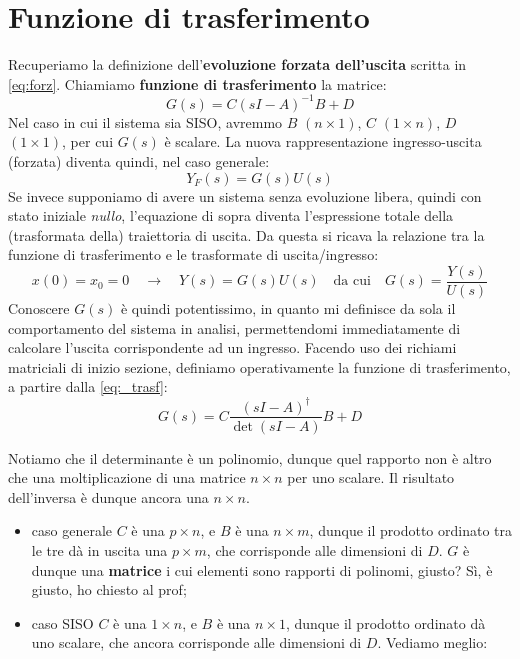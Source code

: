 \section{Funzione di trasferimento}
\begin{defin}{}{}
Recuperiamo la definizione dell'\textbf{evoluzione forzata dell'uscita} scritta in \eqref{eq:forz}. Chiamiamo  \textbf{funzione di trasferimento} la matrice:
\begin{equation}
\label{eq:_trasf}
G(s) = C(sI-A)^{-1}B + D
\end{equation}
Nel caso in cui il sistema sia SISO, avremmo $B$ $(n\times 1)$, $C$ $(1 \times n)$, $D$ $(1 \times 1)$, per cui $G(s)$ è scalare. La nuova rappresentazione ingresso-uscita (forzata) diventa quindi, nel caso generale:
\begin{equation}
\label{eq:gs_evoforz_y}
Y_F(s) = G(s)U(s)
\end{equation}
Se invece supponiamo di avere un sistema senza evoluzione libera, quindi con stato iniziale \textit{nullo}, l'equazione di sopra diventa l'espressione totale della (trasformata della) traiettoria di uscita. Da questa si ricava la relazione tra la funzione di trasferimento e le trasformate di uscita/ingresso:
\begin{equation}
	x(0) = x_0 = 0 \quad \rightarrow \quad Y(s) = G(s)U(s) \quad \textrm{da cui} \quad \boxed{G(s) = \frac{Y(s)}{U(s)}}
\end{equation}
Conoscere $G(s)$ è quindi potentissimo, in quanto mi definisce da sola il comportamento del sistema in analisi, permettendomi immediatamente di calcolare l'uscita corrispondente ad un ingresso.
\bb
Facendo uso dei richiami matriciali di inizio sezione, definiamo operativamente la funzione di trasferimento, a partire dalla \eqref{eq:_trasf}:
\begin{equation}
G(s) = C \frac{(sI-A)^\dag}{\det(sI-A)}B+D
\end{equation} 
\end{defin}
Notiamo che il determinante è un polinomio, dunque quel rapporto non è altro che una moltiplicazione di una matrice $n\times n$ per uno scalare. Il risultato dell'inversa è dunque ancora una $n\times n$.
\begin{itemize}
\item caso generale \rarr $C$ è una $p \times n$, e $B$ è una $n \times m$, dunque il prodotto ordinato tra le tre dà in uscita una $p \times m$, che corrisponde alle dimensioni di $D$. $G$ è dunque una \textbf{matrice} i cui elementi sono rapporti di polinomi, giusto? Sì, è giusto, ho chiesto al prof;
\item caso SISO \rarr $C$ è una $1\times n$, e $B$ è una $n\times 1$, dunque il prodotto ordinato dà uno scalare, che ancora corrisponde alle dimensioni di $D$. Vediamo meglio:
\end{itemize}

